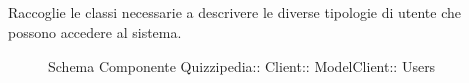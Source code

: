 \subsection{}
Raccoglie le classi necessarie a descrivere le diverse tipologie di utente che possono accedere al sistema.
\begin{figure}[H]
\centering
\noindent{}
\caption[Schema Componente Users]{Schema Componente Quizzipedia:: Client:: ModelClient:: Users}
\end{figure}
